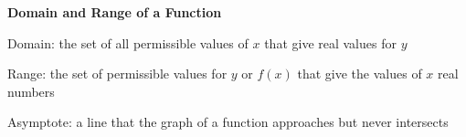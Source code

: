 \begin{center}
\textbf{Domain and Range of a Function}
\end{center}

\vspace*{1ex}

Domain: the set of all permissible values of $x$ that  give real values  for  $y$ 
 
\vspce 

Range: the set of permissible  values  for ${y }$   or  ${f(x) }$  that give the values of  ${x }$   real numbers

\vspce 

Asymptote: a line that the graph of a function approaches but never intersects


